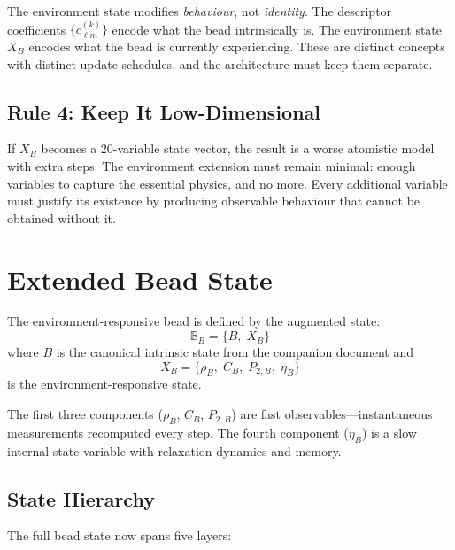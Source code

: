 \documentclass[11pt]{article}
\begin{document}
The environment state modifies \emph{behaviour}, not \emph{identity}.
The descriptor coefficients $\{c_{\ell m}^{(k)}\}$ encode what the bead
intrinsically is.  The environment state $X_B$ encodes what the bead is
currently experiencing.  These are distinct concepts with distinct update
schedules, and the architecture must keep them separate.

\subsection{Rule 4: Keep It Low-Dimensional}

If $X_B$ becomes a 20-variable state vector, the result is a worse
atomistic model with extra steps.  The environment extension must remain
minimal: enough variables to capture the essential physics, and no more.
Every additional variable must justify its existence by producing observable
behaviour that cannot be obtained without it.

\section{Extended Bead State}

The environment-responsive bead is defined by the augmented state:
\begin{equation}
\boxed{
    \mathbb{B}_B = \bigl\{ B,\; X_B \bigr\}
}
\end{equation}
where $B$ is the canonical intrinsic state from the companion document and
\begin{equation}
    X_B = \bigl\{ \rho_B,\; C_B,\; P_{2,B},\; \eta_B \bigr\}
\end{equation}
is the environment-responsive state.

The first three components ($\rho_B$, $C_B$, $P_{2,B}$) are fast
observables---instantaneous measurements recomputed every step.  The fourth
component ($\eta_B$) is a slow internal state variable with relaxation
dynamics and memory.

\subsection{State Hierarchy}

The full bead state now spans five layers:
\end{document}
